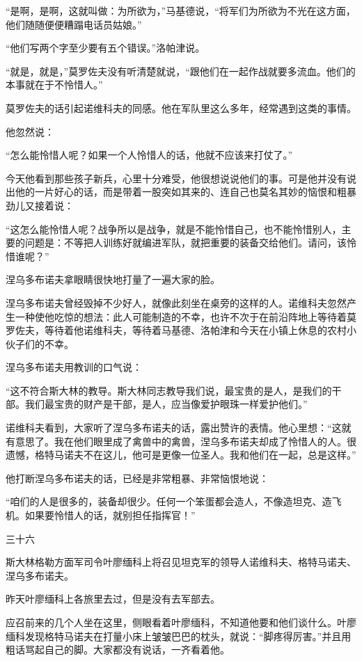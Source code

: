 “是啊，是啊，这就叫做：为所欲为，”马基德说，“将军们为所欲为不光在这方面，他们随随便便糟蹋电话员姑娘。”

“他们写两个字至少要有五个错误。”洛帕津说。

“就是，就是，”莫罗佐夫没有听清楚就说，“跟他们在一起作战就要多流血。他们的本事就在于不怜惜人。”

莫罗佐夫的话引起诺维科夫的同感。他在军队里这么多年，经常遇到这类的事情。

他忽然说：

“怎么能怜惜人呢？如果一个人怜惜人的话，他就不应该来打仗了。”

今天他看到那些孩子新兵，心里十分难受，他很想说说他们的事。可是他并没有说出他的一片好心的话，而是带着一股突如其来的、连自己也莫名其妙的恼恨和粗暴劲儿又接着说：

“这怎么能怜惜人呢？战争所以是战争，就是不能怜惜自己，也不能怜惜别人，主要的问题是：不等把人训练好就编进军队，就把重要的装备交给他们。请问，该怜惜谁呢？”

涅乌多布诺夫拿眼睛很快地打量了一遍大家的脸。

涅乌多布诺夫曾经毁掉不少好人，就像此刻坐在桌旁的这样的人。诺维科夫忽然产生一种使他吃惊的想法：此人可能制造的不幸，也许不次于在前沿阵地上等待着莫罗佐夫，等待着他诺维科夫，等待着马基德、洛帕津和今天在小镇上休息的农村小伙子们的不幸。

涅乌多布诺夫用教训的口气说：

“这不符合斯大林的教导。斯大林同志教导我们说，最宝贵的是人，是我们的干部。我们最宝贵的财产是干部，是人，应当像爱护眼珠一样爱护他们。”

诺维科夫看到，大家听了涅乌多布诺夫的话，露出赞许的表情。他心里想：“这就有意思了。我在他们眼里成了禽兽中的禽兽，涅乌多布诺夫却成了怜惜人的人。很遗憾，格特马诺夫不在这儿，他可是更像一位圣人。我和他们在一起，总是这样。”

他打断涅乌多布诺夫的话，已经是非常粗暴、非常恼恨地说：

“咱们的人是很多的，装备却很少。任何一个笨蛋都会造人，不像造坦克、造飞机。如果要怜惜人的话，就别担任指挥官！”

三十六

斯大林格勒方面军司令叶廖缅科上将召见坦克军的领导人诺维科夫、格特马诺夫、涅乌多布诺夫。

昨天叶廖缅科上各旅里去过，但是没有去军部去。

应召前来的几个人坐在这里，侧眼看着叶廖缅科，不知道他要和他们谈什么。叶廖缅科发现格特马诺夫在打量小床上皱皱巴巴的枕头，就说：“脚疼得厉害。”并且用粗话骂起自己的脚。大家都没有说话，一齐看着他。

